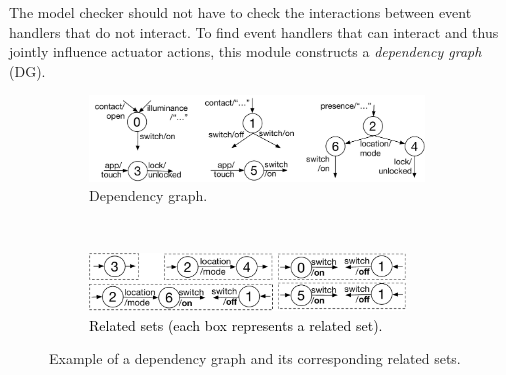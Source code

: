 
The model checker should not have to check the interactions
between event handlers that do not interact. To find
event handlers that can interact and thus jointly influence actuator actions,
this module constructs a {\em dependency graph} (DG).

\begin{figure}[bt]
    \centering
    \begin{subfigure}[t]{3.5in}
        \centering
        \includegraphics[width=3.5in]{DependencyGraphExample}
		\caption{Dependency graph.}
        \label{dgconstructionfg}
    \end{subfigure}\\
    \vspace{0.05in}
    \begin{subfigure}[t]{3.3in}
        \centering
        \includegraphics[width=3.3in]{related_set}
        \caption{\textcolor{black}{Related sets (each box represents a related set).}}
        \label{relatedset}
    \end{subfigure}
    \caption{Example of a dependency graph and its corresponding related sets.}
\end{figure}

